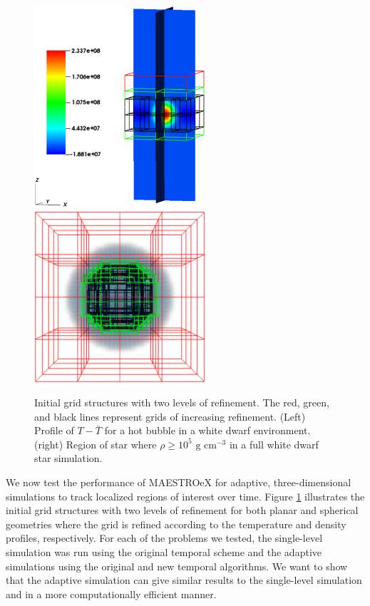 \begin{figure}[htb]
\begin{center}
\includegraphics[width=2.5in]{./figs/reacting_bubble_amr} \hspace{2.5em}
\includegraphics[width=2.5in]{./figs/wdconvect_amr_3grid}
\caption{\label{fig:amr_grids} Initial grid structures with two levels of refinement.
         The red, green, and black lines represent grids of increasing refinement.
         (Left) Profile of $T - \bar{T}$ for a hot bubble in a white dwarf environment.
         (right) Region of star where $\rho\ge 10^5 \text{ g cm}^{-3}$ in a full white dwarf star simulation. }
\end{center}
\end{figure}

We now test the performance of MAESTROeX for adaptive, three-dimensional simulations to track localized regions of interest over time. Figure \ref{fig:amr_grids} illustrates the initial grid structures with two levels of refinement for both planar and spherical geometries where the grid is refined according to the temperature and density profiles, respectively. For each of the problems we tested, the single-level simulation was run using the original temporal scheme and the adaptive simulations using the original and new temporal algorithms. We want to show that the adaptive simulation can give similar results to the single-level simulation and in a more computationally efficient manner.

